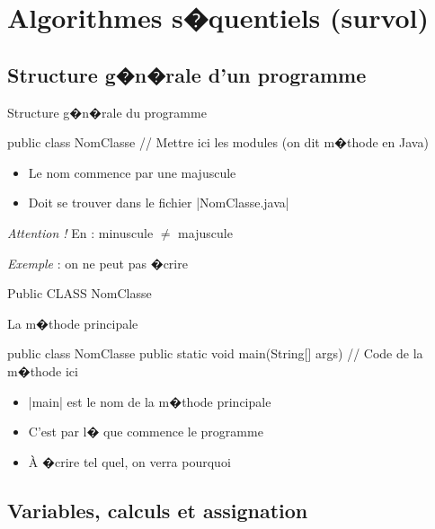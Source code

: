 
\section{Algorithmes s�quentiels (survol)}


\subsection{Structure g�n�rale d'un programme}

\begin{frame}[fragile]{Structure g�n�rale du programme}
\begin{Java}
  public class NomClasse {
    // Mettre ici les modules (on dit m�thode en Java)
  }
\end{Java}
\begin{itemize}
\item Le nom commence par une majuscule
\item Doit se trouver dans le fichier \code|NomClasse.java|
\end{itemize}
\bigskip
\emph{Attention !} En  : minuscule $\neq$ majuscule
\par\medskip
\emph{Exemple} : on ne peut pas �crire
\begin{Java}
  Public CLASS NomClasse {
    
  }
\end{Java}
\end{frame}

\begin{frame}[fragile]{La m�thode principale}
\begin{Java}
  public class NomClasse {
    public static void main(String[] args) {
      // Code de la m�thode ici     
    }
  }
\end{Java}
\begin{itemize}
\item \java|main| est le nom de la m�thode principale
\item C'est par l� que commence le programme
\item \`A �crire tel quel, on verra pourquoi
\end{itemize}
\end{frame}

\subsection{Variables, calculs et assignation}

